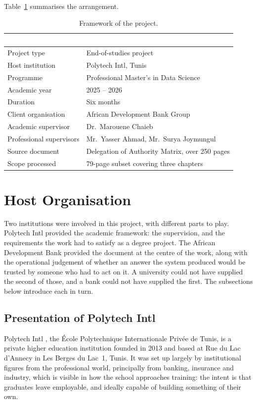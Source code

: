 Table~\ref{tab:framework} summarises the arrangement.
\begin{table}[h]
\centering
\caption{Framework of the project.}
\label{tab:framework}
\begin{tabular}{|p{}|p{}|}
\hline
\rowcolor{myblue}\textcolor{white}{\textbf{Item}} & \textcolor{white}{\textbf{Detail}} \\
\hline
Project type & End-of-studies project \\ \hline
Host institution & Polytech Intl, Tunis \\ \hline
Programme & Professional Master's in Data Science \\ \hline
Academic year & 2025 -- 2026 \\ \hline
Duration & Six months \\ \hline
Client organisation & African Development Bank Group \\ \hline
Academic supervisor & Dr.~Marouene Chaieb \\ \hline
Professional supervisors & Mr.~Yasser Ahmad, Mr.~Surya Joymungul \\ \hline
Source document & Delegation of Authority Matrix, over 250 pages \\ \hline
Scope processed & 79-page subset covering three chapters \\ \hline
\end{tabular}
\end{table}
\section{Host Organisation}
\label{sec:hostorg}

Two institutions were involved in this project, with different parts to play. Polytech
Intl provided the academic framework: the supervision, and the requirements the work had
to satisfy as a degree project. The African Development Bank provided the document at the
centre of the work, along with the operational judgement of whether an answer the system
produced would be trusted by someone who had to act on it. A university could not have
supplied the second of those, and a bank could not have supplied the first. The
subsections below introduce each in turn.

\subsection{Presentation of Polytech Intl}


Polytech Intl \citep{polytechintl}, the \'Ecole Polytechnique Internationale Priv\'ee de Tunis, is a
private higher education institution founded in 2013 and based at Rue du Lac
d'Annecy in Les Berges du Lac~1, Tunis. It was set up largely by institutional
figures from the professional world, principally from banking, insurance and
industry, which is visible in how the school approaches training: the intent is
that graduates leave employable, and ideally capable of building something of
their own.

